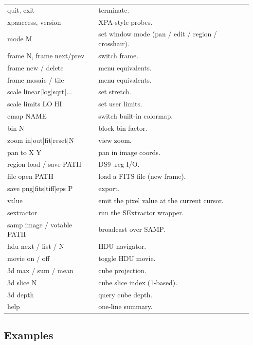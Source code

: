 \documentclass[11pt,a4paper]{article}
\begin{document}
\begin{tabular}{@{}>{\sffamily}lp{}@{}}
\toprule
quit, exit                & terminate. \\
xpaaccess, version        & XPA-style probes. \\
mode M                    & set window mode (pan / edit / region / crosshair). \\
frame N, frame next/prev  & switch frame. \\
frame new / delete        & menu equivalents. \\
frame mosaic / tile       & menu equivalents. \\
scale linear|log|sqrt|... & set stretch. \\
scale limits LO HI        & set user limits. \\
cmap NAME                 & switch built-in colormap. \\
bin N                     & block-bin factor. \\
zoom in|out|fit|reset|N   & view zoom. \\
pan to X Y                & pan in image coords. \\
region load / save PATH   & DS9 .reg I/O. \\
file open PATH            & load a FITS file (new frame). \\
save png|fits|tiff|eps P  & export. \\
value                     & emit the pixel value at the current cursor. \\
sextractor                & run the SExtractor wrapper. \\
samp image / votable PATH & broadcast over SAMP. \\
hdu next / list / N       & HDU navigator. \\
movie on / off            & toggle HDU movie. \\
3d max / sum / mean       & cube projection. \\
3d slice N                & cube slice index (1-based). \\
3d depth                  & query cube depth. \\
help                      & one-line summary. \\
\bottomrule
\end{tabular}

\subsection{Examples}
\end{document}
